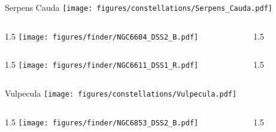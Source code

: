 \documentclass[final]{beamer}
\newlength{\colwidth}
\begin{document}

\begin{frame}[t]{\LARGE Serpens Cauda}
  \centering
  \texttt{[image: figures/constellations/Serpens\_Cauda.pdf]}
\end{frame}


\begin{frame}[t]{}
  \begin{columns}[T]
    \begin{column}{1.5\colwidth}
      \centering
      \texttt{[image: figures/finder/NGC6604\_DSS2\_B.pdf]}
    \end{column}
    \begin{column}{1.5\colwidth}
      \Large
      
    \end{column}
  \end{columns}
  \vspace{\fill}
  \begin{columns}[T]
    \begin{column}{1.5\colwidth}
      \centering
      \texttt{[image: figures/finder/NGC6611\_DSS1\_R.pdf]}
    \end{column}
    \begin{column}{1.5\colwidth}
      \Large
      
    \end{column}
  \end{columns}
\end{frame}


\begin{frame}[t]{\LARGE Vulpecula}
  \centering
  \texttt{[image: figures/constellations/Vulpecula.pdf]}
\end{frame}


\begin{frame}[t]{}
  \begin{columns}[T]
    \begin{column}{1.5\colwidth}
      \centering
      \texttt{[image: figures/finder/NGC6853\_DSS2\_B.pdf]}
    \end{column}
    \begin{column}{1.5\colwidth}
      \Large
      
    \end{column}
  \end{columns}
  \vspace{\fill}
\end{frame}
\end{document}
